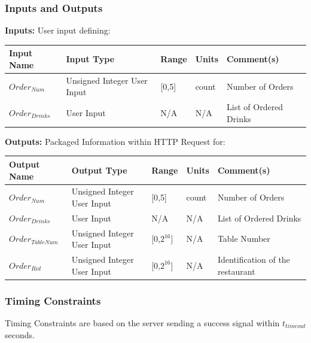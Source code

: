 \documentclass [10pt]{article}
\begin{document}
\subsubsection{Inputs and Outputs}

\textbf{Inputs:}  User input defining:\\

\begin{longtable}{|l|l|l|l|l|}\hline 
	\rowcolor{tableCell}\textbf{Input Name} & \textbf{Input Type} & \textbf{Range} & \textbf{Units} & \textbf{Comment(s)} \\ \hline
	$Order_{Num} $ & Unsigned Integer User Input & [0,5] & count &  Number of Orders \\ \hline
	\rowcolor{tableCell}$Order_{Drinks} $ &  User Input & N/A & N/A &  List of Ordered Drinks \\ \hline
\end{longtable}


\textbf{Outputs:} Packaged Information within HTTP Request for: \\
\begin{longtable}{|l|l|l|l|l|}\hline 
	\rowcolor{tableCell}\textbf{Output Name} & \textbf{Output Type} & \textbf{Range} & \textbf{Units} & \textbf{Comment(s)} \\ \hline
	$Order_{Num} $ & Unsigned Integer User Input & [0,5] & count &  Number of Orders \\ \hline
	\rowcolor{tableCell}$Order_{Drinks} $ &  User Input & N/A & N/A &  List of Ordered Drinks \\ \hline
	$Order_{TableNum} $ & Unsigned Integer User Input & [0,$2^{16}$] & N/A &  Table Number \\ \hline
	\rowcolor{tableCell}$Order_{Rid} $ & Unsigned Integer User Input & [0,$2^{16}$] & N/A & Identification of the restaurant \\ \hline
\end{longtable}



\subsubsection{Timing Constraints}
Timing Constraints are based on the server sending a success signal within $ t_{timeout} $ seconds.

\end{document}
